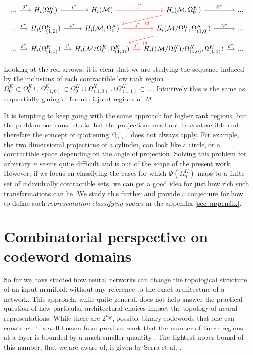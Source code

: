 \begin{equation}
    \begin{tikzcd}[row sep=small,column sep=small]
    ... \arrow[r, "\partial^*"] & H_{i}(\Omega^K_0) \arrow[r, "\iota^*"] & H_i(\mathcal{M}) \arrow[r, red, "j^*"] & H_i(\mathcal{M},\Omega_0^K) \arrow[r, "\partial^*"] \arrow[ld, red, "id"] & ...\\
    ... \arrow[r, "\partial^*"] & H_{i}(\Omega^K_{(1,0)}) \arrow[r, "\iota^*"] & H_i(\mathcal{M},\Omega^K_0) \arrow[r, red, "j^*"] & H_i(\mathcal{M}/\Omega_0^K,\Omega_{(1,0)}^K) \arrow[r, "\partial^*"] \arrow[ld, red, "id"] & ...\\
    ... \arrow[r, "\partial^*"] & H_{i}(\Omega^K_{(1,1)}) \arrow[r, "\iota^*"] & H_i(\mathcal{M}/\Omega_0^K,\Omega_{(1,0)}^K) \arrow[r, red,  "j^*"] & H_i((\mathcal{M}/\Omega_0^K)/\Omega_{(1,0)}^K,\Omega_{(1,1)}^K) \arrow[r, "\partial^*"] & ...
    \end{tikzcd}
\end{equation}

Looking at the red arrows, it is clear that we are studying the sequence induced by the inclusions of each contractible low rank region $\Omega_0^K \subset \Omega_0^K\cup\Omega_{(1,0)}^K \subset \Omega_0^K\cup\Omega_{(1,0)}^K\cup\Omega_{(1,1)}^K \subset ...$. Intuitively this is the same as sequentially gluing different disjoint regions of $\mathcal{M}$.

It is tempting to keep going with the same approach for higher rank regions, but the problem one runs into is that the projections need not be contractible and therefore the concept of quotiening $\Omega_{n>1}$ does not always apply. For example, the two dimensional projections of a cylinder, can look like a circle, or a contractible space depending on the angle of projection. Solving this problem for arbitrary $n$ seems quite difficult and is out of the scope of the present work. However, if we focus on classifying the cases for which $\Phi(\Omega_n^K)$ maps to a finite set of individually contractible sets, we can get a good idea for just how rich such transformations can be. We study this further and provide a conjecture for how to define such \textit{representation classifying spaces} in the appendix \ref{sec: appendix}.

\section{Combinatorial perspective on codeword domains}
So far we have studied how neural networks can change the topological structure of an input manifold, without any reference to the exact architecture of a network. This approach, while quite general, does not help answer the practical question of how particular architectural choices impact the topology of neural representations. While there are $2^{n_K}$, possible binary codewords that one can construct it is well known from previous work that the number of linear regions at a layer is bounded by a much smaller quantity \cite{pascanu2013number, montufar2014number, arora2016understanding, raghu2017expressive, serra2018bounding}. The tightest upper bound of this number, that we are aware of, is given by Serra et al. \cite{serra2018bounding}. 

